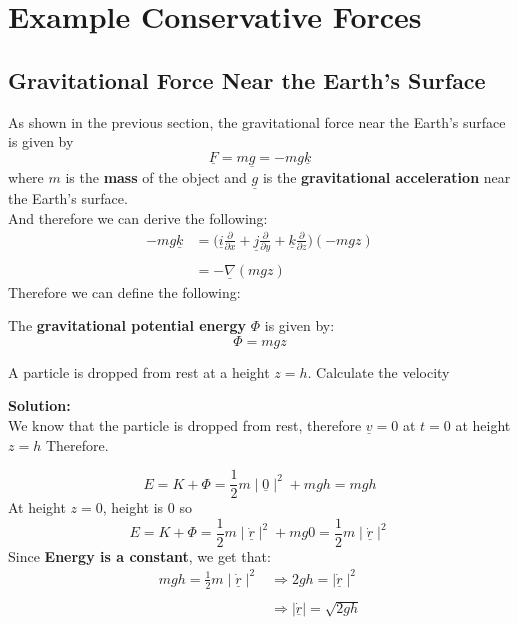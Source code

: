\section{Example Conservative Forces}
\subsection{Gravitational Force Near the Earth's Surface}
As shown in the previous section, the gravitational force near the Earth's surface is given by
$$\underline{F} = m\underline{g} = -mg\underline{k}$$
where $m$ is the {\bf mass} of the object and $\underline{g}$ is the {\bf gravitational acceleration} near the Earth's surface. \\
And therefore we can derive the following:
$$\begin{aligned} -mg\underline{k} & = \Big(\underline{i}\frac{\partial}{\partial x} + \underline{j}\frac{\partial}{\partial y} + \underline{k}\frac{\partial}{\partial z} \Big)(-mgz) \\ \\
                                 & = -\underline{\nabla}(mgz)\end{aligned}$$
Therefore we can define the following:
\begin{definition}
	The {\bf gravitational potential energy} $\Phi$ is given by:
	\begin{equation}
		\label{eq: gravitational-potential-energy-near-earth}
		\Phi = mgz
	\end{equation}
\end{definition}

\begin{eg}
	A particle is dropped from rest at a height $z=h$.
	Calculate the velocity

		{\bf Solution:} \\
	We know that the particle is dropped from rest, therefore $\underline{v} = 0$ at $t=0$ at height $z = h$ Therefore.

	$$E = K + \Phi = \frac{1}{2}m\mid\underline{0} \mid^{2} + mgh = mgh$$
	At height $z = 0$, height is 0 so
	$$E = K + \Phi = \frac{1}{2}m\mid\underline{\dot{r}}\mid^{2} + mg0 = \frac{1}{2}m\mid\underline{\dot{r}}\mid^{2}$$
	Since {\bf Energy is a constant}, we get that:
	$$\begin{aligned} mgh = \frac{1}{2}m\mid\underline{\dot{r}}\mid^{2} & \Rightarrow 2gh = \mid \underline{\dot{r}}\mid^{2}     \\ \\
                                                                  & \Rightarrow \mid \underline{\dot{r}} \mid = \sqrt{2gh}\end{aligned}$$
\end{eg}

